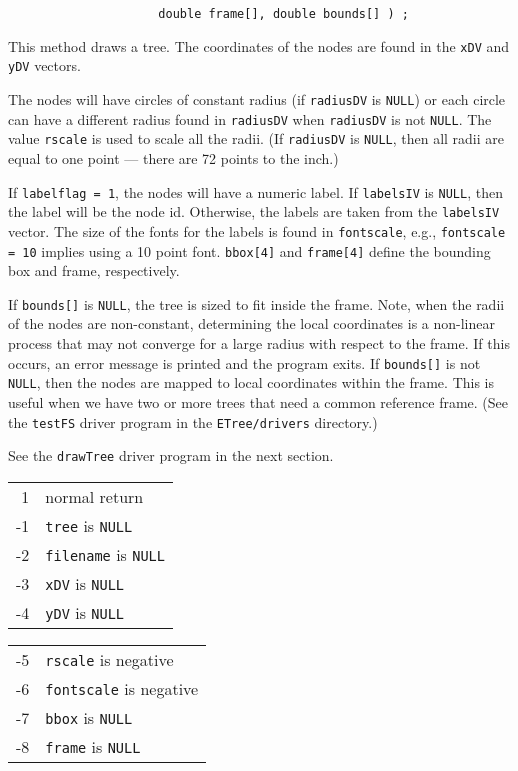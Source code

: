 \begin{enumerate}
\begin{verbatim}
                     double frame[], double bounds[] ) ;
\end{verbatim}
This method draws a tree.
The coordinates of the nodes are found in the {\tt xDV} 
and {\tt yDV} vectors.
\par
The nodes will have circles of constant radius 
(if {\tt radiusDV} is {\tt NULL}) 
or each circle can have a different radius found in {\tt radiusDV}
when {\tt radiusDV} is not {\tt NULL}.
The value {\tt rscale} is used to scale all the radii.
(If {\tt radiusDV} is {\tt NULL}, then all radii are equal to one
point --- there are 72 points to the inch.)
\par
If {\tt labelflag = 1}, the nodes will have a numeric label.
If {\tt labelsIV} is {\tt NULL}, then the label will be the node id.
Otherwise, the labels are taken from the {\tt labelsIV} vector.
The size of the fonts for the labels is found in {\tt fontscale},
e.g., {\tt fontscale = 10} implies using a 10 point font.
{\tt bbox[4]} and {\tt frame[4]} define the bounding box and frame,
respectively.
\par
If {\tt bounds[]} is {\tt NULL}, the tree is sized to fit inside
the frame. Note, when the radii of the nodes are non-constant,
determining the local coordinates is a non-linear process that
may not converge for a large radius with respect to the frame.
If this occurs, an error message is printed and the program exits.
If {\tt bounds[]} is not {\tt NULL}, then the nodes are mapped
to local coordinates within the frame.
This is useful when we have two or more trees that need a common
reference frame.
(See the {\tt testFS} driver program in the {\tt ETree/drivers}
directory.)
\par
See the {\tt drawTree} driver program in the next section.
\par {}
\begin{center}
\begin{tabular}{rl}
 1 & normal return \\
-1 & {\tt tree} is {\tt NULL} \\
-2 & {\tt filename} is {\tt NULL} \\
-3 & {\tt xDV} is {\tt NULL} \\
-4 & {\tt yDV} is {\tt NULL}
\end{tabular}
\quad
\begin{tabular}{rl}
-5 & {\tt rscale} is negative \\
-6 & {\tt fontscale} is negative \\
-7 & {\tt bbox} is {\tt NULL} \\
-8 & {\tt frame} is {\tt NULL}
\end{tabular}
\end{center}
\end{enumerate}
\par
